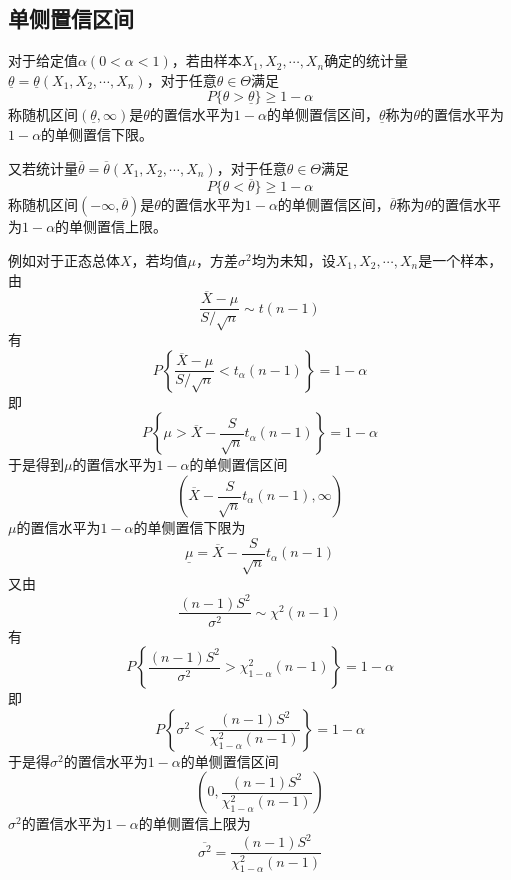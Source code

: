 \subsection{单侧置信区间}
    \begin{definition}
        对于给定值$\alpha(0<\alpha<1)$，若由样本$X_1,X_2,\cdots,X_n$确定的统计量$\underline{\theta}=\underline{\theta}(X_1,X_2,\cdots,X_n)$，对于任意$\theta\in \varTheta$满足
        $$P\{\theta>\underline{\theta}\}\geq 1-\alpha$$
        称随机区间$(\underline{\theta},\infty)$是$\theta$的置信水平为$1-\alpha$的{\heiti 单侧置信区间}，$\underline{\theta}$称为$\theta$的置信水平为$1-\alpha$的{\heiti 单侧置信下限}。

        又若统计量$\overline{\theta}=\overline{\theta}(X_1,X_2,\cdots,X_n)$，对于任意$\theta\in \varTheta$满足
        $$P\{\theta<\overline{\theta}\}\geq 1-\alpha$$
        称随机区间$(-\infty,\overline{\theta})$是$\theta$的置信水平为$1-\alpha$的{\heiti 单侧置信区间}，$\overline{\theta}$称为$\theta$的置信水平为$1-\alpha$的{\heiti 单侧置信上限}。

        例如对于正态总体$X$，若均值$\mu$，方差$\sigma^2$均为未知，设$X_1,X_2,\cdots,X_n$是一个样本，由
        $$\frac{\overline{X}-\mu}{S/\sqrt{n}}\sim t(n-1)$$
        有$$P\left\{\frac{\overline{X}-\mu}{S/\sqrt{n}}<t_\alpha(n-1)\right\}=1-\alpha$$
        即$$P\left\{\mu>\overline{X}-\frac{S}{\sqrt{n}}t_\alpha(n-1)\right\}=1-\alpha$$
        于是得到$\mu$的置信水平为$1-\alpha$的单侧置信区间
        $$\left(\overline{X}-\frac{S}{\sqrt{n}}t_\alpha(n-1),\infty\right)$$
        $\mu$的置信水平为$1-\alpha$的单侧置信下限为
        $$\underline{\mu}=\overline{X}-\frac{S}{\sqrt{n}}t_\alpha(n-1)$$
        又由$$\frac{(n-1)S^2}{\sigma^2}\sim \chi^2(n-1)$$
        有
        $$P\left\{\frac{(n-1)S^2}{\sigma^2}>\chi_{1-\alpha}^2(n-1)\right\}=1-\alpha$$
        即
        $$P\left\{\sigma^2<\frac{(n-1)S^2}{\chi_{1-\alpha}^2(n-1)}\right\}=1-\alpha$$
        于是得$\sigma^2$的置信水平为$1-\alpha$的单侧置信区间
        $$\left(0,\frac{(n-1)S^2}{\chi_{1-\alpha}^2(n-1)}\right)$$
        $\sigma^2$的置信水平为$1-\alpha$的单侧置信上限为
        $$\overline{\sigma^2}=\frac{(n-1)S^2}{\chi_{1-\alpha}^2(n-1)}$$
    \end{definition}

